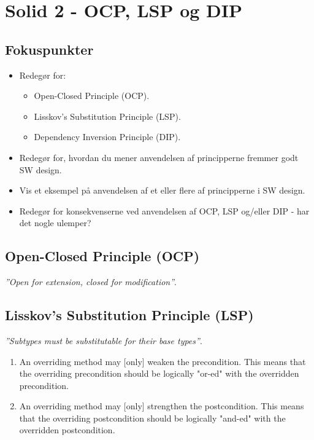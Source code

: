 \section{Solid 2 - OCP, LSP og DIP}

\subsection{Fokuspunkter}

\begin{itemize}
	\item Redegør for:
	\begin{itemize}
		\item Open-Closed Principle (OCP).
		\item Lisskov's Substitution Principle (LSP).
		\item Dependency Inversion Principle (DIP).
	\end{itemize}
	\item Redegør for, hvordan du mener anvendelsen af principperne fremmer godt SW design.
	\item Vis et eksempel på anvendelsen af et eller flere af principperne i SW design.
	\item Redegør for konsekvenserne ved anvendelsen af OCP, LSP og/eller DIP - har det nogle ulemper?
\end{itemize}

\subsection{Open-Closed Principle (OCP)}
\textit{''Open for extension, closed for modification''}.

\subsection{Lisskov's Substitution Principle (LSP)}
\textit{''Subtypes must be substitutable for their base types''}.

\begin{enumerate}
	\item An overriding method may [only] weaken the precondition. This means
	that the overriding precondition should be logically "or-ed" with the
	overridden precondition.
	\item An overriding method may [only] strengthen the postcondition. This
	means that the overriding postcondition should be logically "and-ed" with
	the overridden postcondition.
\end{enumerate}

